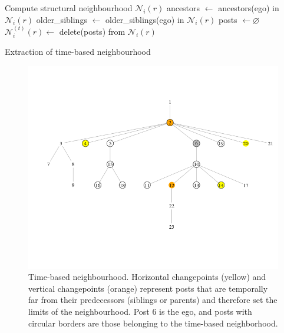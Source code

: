 \documentclass[9pt,technote]{IEEEtran}
\begin{document}
\begin{algorithm}[H]
 Compute structural neighbourhood $\mathcal{N}_i(r)$\;
 ancestors $\leftarrow$  ancestors(ego) in $\mathcal{N}_i(r)$\;
 older\_siblings $\leftarrow$ older\_siblings(ego) in $\mathcal{N}_i(r)$\;
 posts $\leftarrow \varnothing$\;
 $\mathcal{N}_i^{(t)}(r) \leftarrow$ delete(posts) from $\mathcal{N}_i(r)$\;
 \caption{Extraction of time-based neighbourhood}
 \label{alg:temporal_neighbourhood}
\end{algorithm}
 
\begin{figure}
\centering
\includegraphics[width=1\textwidth]{breakpoints}
\caption{Time-based neighbourhood. Horizontal changepoints (yellow) and vertical changepoints (orange) represent posts that are temporally far from their predecessors (siblings or parents) and therefore set the limits of the neighbourhood. Post 6 is the ego, and posts with circular borders are those belonging to the time-based neighborhood.}
\label{fig:cutpoints}
\end{figure}
\end{document}
